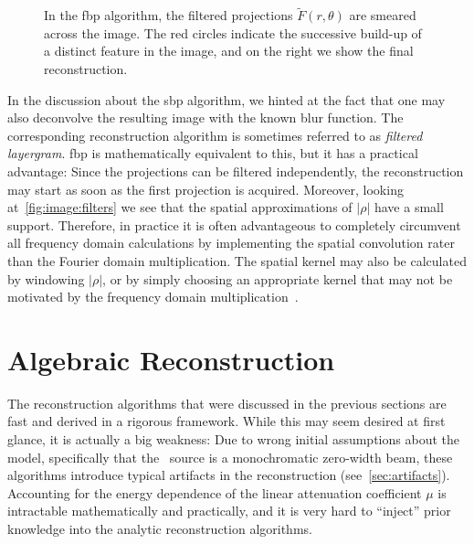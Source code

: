 \documentclass[../ml-ct.tex]{subfiles}
\begin{document}
\begin{figure}
{}
	\caption[The Filtered Back-Projection Algorithm.]{
		In the \gls{fbp} algorithm, the filtered projections \( \tilde{F}(r, \theta)\) are smeared across the image.
		The red circles indicate the successive build-up of a distinct feature in the image, and on the right we show the final reconstruction.
	}%
	\label{fig:image:filtered backprojection example}
\end{figure}

In the discussion about the \gls{sbp} algorithm, we hinted at the fact that one may also deconvolve the resulting image with the known blur function.
The corresponding reconstruction algorithm is sometimes referred to as \emph{filtered layergram}.
\gls{fbp} is mathematically equivalent to this, but it has a practical advantage:
Since the projections can be filtered independently, the reconstruction may start as soon as the first projection is acquired.
Moreover, looking at~\cref{fig:image:filters} we see that the spatial approximations of \( |\rho| \) have a small support.
Therefore, in practice it is often advantageous to completely circumvent all frequency domain calculations by implementing the spatial convolution rater than the Fourier domain multiplication.
The spatial kernel may also be calculated by windowing \( |\rho| \), or by simply choosing an appropriate kernel that may not be motivated by the frequency domain multiplication~\cite{ramachandran_reconstruction_1971}.
\section{Algebraic Reconstruction}
The reconstruction algorithms that were discussed in the previous sections are fast and derived in a rigorous framework.
While this may seem desired at first glance, it is actually a big weakness:
Due to wrong initial assumptions about the model, specifically that the \xray\ source is a monochromatic zero-width beam, these algorithms introduce typical artifacts in the reconstruction (see~\cref{sec:artifacts}).
Accounting for the energy dependence of the linear attenuation coefficient \( \mu \) is intractable mathematically and practically, and it is very hard to \enquote{inject} prior knowledge into the analytic reconstruction algorithms.
\end{document}
